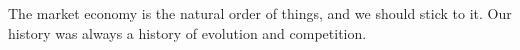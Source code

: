 The market economy is the natural order of things, and we should stick to it.
Our history was always a history of evolution and competition.